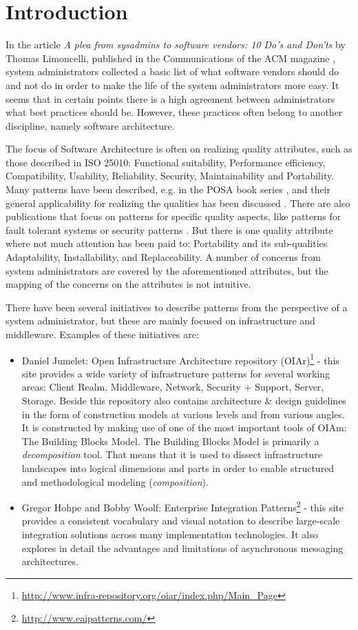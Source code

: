 \section{Introduction} 
In the article \textit{A plea from sysadmins to software vendors: 10 Do's and Don'ts} by Thomas Limoncelli, published in the Communications of the ACM magazine \cite{Limoncelli2011a}, system administrators collected a basic list of what software vendors should do and not do in order to make the life of the system administrators more easy. It seems that in certain points there is a high agreement between administrators what best practices should be. However, these practices often belong to another discipline, namely software architecture. 

The focus of Software Architecture is often on realizing quality attributes, such as those described in ISO 25010: Functional suitability, Performance efficiency, Compatibility, Usability, Reliability, Security, Maintainability and Portability. Many patterns have been described, e.g. in the POSA book series \cite{Buschmann1996}, and their general applicability for realizing the qualities has been discussed \cite{Harrison2011}. There are also publications that focus on patterns for specific quality aspects, like patterns for fault tolerant systems \cite{Hanmer2007} or security patterns \cite{Schumacher2005}. But there is one quality attribute where not much attention has been paid to: Portability and its sub-qualities Adaptability, Installability, and Replaceability. A number of concerns from system administrators are covered by the aforementioned attributes, but the mapping of the concerns on the attributes is not intuitive.

There have been several initiatives to describe patterns from the perspective of a system administrator, but these are mainly focused on infrastructure and middleware. Examples of these initiatives are: 
\begin{itemize}
	\item Daniel Jumelet: Open Infrastructure Architecture repository (OIAr)\footnote{\url{http://www.infra-repository.org/oiar/index.php/Main_Page}} - this site provides a wide variety of infrastructure patterns for several working areas: Client Realm, Middleware, Network, Security + Support, Server, Storage. Beside this repository also contains architecture \& design guidelines in the form of construction models at various levels and from various angles. It is constructed by making use of one of the most important tools of OIAm: The Building Blocks Model. The Building Blocks Model is primarily a \textit{decomposition} tool. That means that it is used to dissect infrastructure landscapes into logical dimensions and parts in order to enable structured and methodological modeling (\textit{composition}). 
	\item Gregor Hohpe and Bobby Woolf: Enterprise Integration Patterns\footnote{\url{http://www.eaipatterns.com/}} - this site provides a consistent vocabulary and visual notation to describe large-scale integration solutions across many implementation technologies. It also explores in detail the advantages and limitations of asynchronous messaging architectures. 
\end{itemize}

